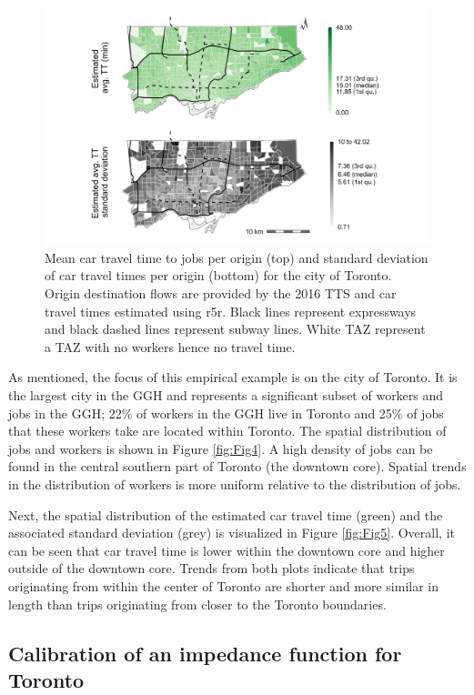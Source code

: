 \documentclass[10pt,letterpaper]{article}
\begin{document}
\begin{figure}
\includegraphics[width=1\linewidth]{images/Fig5} \caption{\label{fig:Fig5}  Mean car travel time to jobs per origin (top) and standard deviation of car travel times per origin (bottom) for the city of Toronto. Origin destination flows are provided by the 2016 TTS and car travel times estimated using r5r. Black lines represent expressways and black dashed lines represent subway lines. White TAZ represent a TAZ with no workers hence no travel time.}\label{fig:spatial-dist-Toronto-plot2}
\end{figure}

As mentioned, the focus of this empirical example is on the city of
Toronto. It is the largest city in the GGH and represents a significant
subset of workers and jobs in the GGH; 22\% of workers in the GGH live
in Toronto and 25\% of jobs that these workers take are located within
Toronto. The spatial distribution of jobs and workers is shown in Figure
\ref{fig:Fig4}. A high density of jobs can be found in the central
southern part of Toronto (the downtown core). Spatial trends in the
distribution of workers is more uniform relative to the distribution of
jobs.

Next, the spatial distribution of the estimated car travel time (green)
and the associated standard deviation (grey) is visualized in Figure
\ref{fig:Fig5}. Overall, it can be seen that car travel time is lower
within the downtown core and higher outside of the downtown core. Trends
from both plots indicate that trips originating from within the center
of Toronto are shorter and more similar in length than trips originating
from closer to the Toronto boundaries.

\hypertarget{calibration-of-an-impedance-function-for-toronto}{%
\subsection{Calibration of an impedance function for
Toronto}\label{calibration-of-an-impedance-function-for-toronto}}
\end{document}
